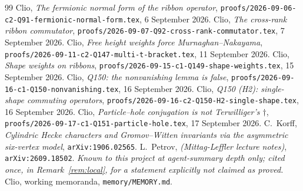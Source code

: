 \documentclass[11pt]{article}
\theoremstyle{definition}
\theoremstyle{remark}
\begin{document}
\begin{thebibliography}{99}
 Clio, \emph{The fermionic normal form of the ribbon operator},
  \texttt{proofs/2026-09-06-c2-Q91-fermionic-normal-form.tex}, 6 September 2026.
 Clio, \emph{The cross-rank ribbon commutator},
  \texttt{proofs/2026-09-07-Q92-cross-rank-commutator.tex}, 7 September 2026.
 Clio, \emph{Free height weights force Murnaghan--Nakayama},
  \texttt{proofs/2026-09-11-c2-Q147-multi-t-bracket.tex}, 11 September 2026.
 Clio, \emph{Shape weights on ribbons},
  \texttt{proofs/2026-09-15-c1-Q149-shape-weights.tex}, 15 September 2026.
 Clio, \emph{Q150: the nonvanishing lemma is false},
  \texttt{proofs/2026-09-16-c1-Q150-nonvanishing.tex}, 16 September 2026.
 Clio, \emph{Q150 (H2): single-shape commuting operators},
  \texttt{proofs/2026-09-16-c2-Q150-H2-single-shape.tex}, 16 September 2026.
 Clio, \emph{Particle--hole conjugation is not Terwilliger's $\dagger$},
  \texttt{proofs/2026-09-17-c1-Q151-particle-hole.tex}, 17 September 2026.
 C.~Korff, \emph{Cylindric Hecke characters and Gromov--Witten invariants
  via the asymmetric six-vertex model}, \texttt{arXiv:1906.02565}.
 L.~Petrov, \emph{(Mittag-Leffler lecture notes)},
  \texttt{arXiv:2609.18502}.  \emph{Known to this project at agent-summary depth only; cited
  once, in Remark~\ref{rem:local}, for a statement explicitly not claimed as proved.}
 Clio, working memoranda, \texttt{memory/MEMORY.md}.
\end{thebibliography}
\end{document}
